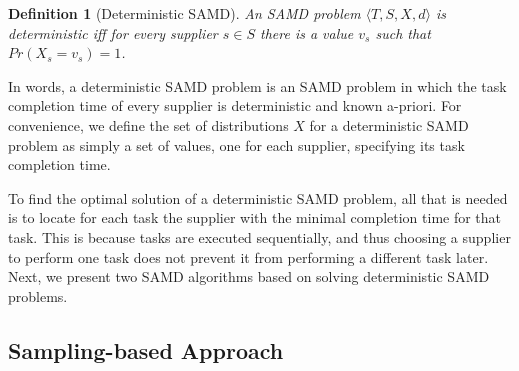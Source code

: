 \documentclass[letterpaper]{article} %
\newtheorem{definition}{Definition}
\newcommand{\tuple}[1]{\langle#1\rangle}
\newcommand{\samd}{\ac{SAMD}\xspace}
\newcommand{\sampling}{\textsc{Sampling}\xspace}
\begin{document}
\begin{definition}[Deterministic \samd] 
An \samd problem $\tuple{T, S, X, d}$ is \emph{deterministic} 
iff for every supplier $s\in S$ there is a value $v_s$ such that $Pr(X_s=v_s)=1$.
\label{def:deterministic}
\end{definition}
In words, a deterministic \samd problem is an \samd problem in which the task completion time of every supplier is deterministic and known a-priori. %
For convenience, we define the set of distributions $X$ 
for a deterministic \samd problem as simply a set of values, one for each supplier, specifying its task completion time. %

To find the optimal solution of a deterministic \samd problem, all that is needed is to locate for each task the supplier with the minimal completion time for that task. This is because tasks are executed sequentially, and thus choosing a supplier to perform one task does not prevent it from performing a different task later. Next, we present two \samd algorithms based on solving deterministic \samd problems. 




\subsection{Sampling-based Approach}\label{sec:sampling}


\end{document}
